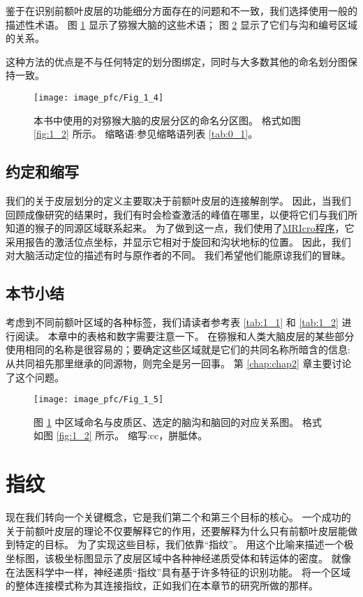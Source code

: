 \par
鉴于在识别前额叶皮层的功能细分方面存在的问题和不一致，我们选择使用一般的描述性术语。
图 \ref{fig:1_4} 显示了猕猴大脑的这些术语；
图 \ref{fig:1_5} 显示了它们与沟和编号区域的关系。

这种方法的优点是不与任何特定的划分图绑定，同时与大多数其他的命名划分图保持一致。

\begin{figure}[!htb]
	\centering
	\texttt{[image: image\_pfc/Fig\_1\_4]}
	\caption{本书中使用的对猕猴大脑的皮层分区的命名分区图。
		格式如图 \ref{fig:1_2} 所示。
		缩略语:参见缩略语列表 \ref{tab:0_1}。\label{fig:1_4}}
\end{figure}




\subsection{约定和缩写}
我们的关于皮层划分的定义主要取决于前额叶皮层的连接解剖学。
因此，当我们回顾成像研究的结果时，我们有时会检查激活的峰值在哪里，以便将它们与我们所知道的猴子的同源区域联系起来。
为了做到这一点，我们使用了\href{http://www.cabiatl.com/mricro/MRIcro/index.html}{MRIcro程序}，它采用报告的激活位点坐标，并显示它相对于旋回和沟状地标的位置。
因此，我们对大脑活动定位的描述有时与原作者的不同。
我们希望他们能原谅我们的冒昧。


\subsection{本节小结}
考虑到不同前额叶区域的各种标签，我们请读者参考表 \ref{tab:1_1} 和 \ref{tab:1_2} 进行阅读。
本章中的表格和数字需要注意一下。
在猕猴和人类大脑皮层的某些部分使用相同的名称是很容易的；要确定这些区域就是它们的共同名称所暗含的信息:从共同祖先那里继承的同源物，则完全是另一回事。
第 \ref{chap:chap2} 章主要讨论了这个问题。

\begin{figure}[!htb]
	\centering
	\texttt{[image: image\_pfc/Fig\_1\_5]}
	\caption{图 \ref{fig:1_4} 中区域命名与皮质区、选定的脑沟和脑回的对应关系图。
		格式如图 \ref{fig:1_2} 所示。
		缩写:cc，胼胝体。\label{fig:1_5}}
\end{figure}



\section{指纹}
现在我们转向一个关键概念，它是我们第二个和第三个目标的核心。
一个成功的关于前额叶皮层的理论不仅要解释它的作用，还要解释为什么只有前额叶皮层能做到特定的目标。
为了实现这些目标，我们依靠“指纹”。
用这个比喻来描述一个极坐标图\cite{zilles2001cyto}，该极坐标图显示了皮层区域中各种神经递质受体和转运体的密度。
就像在法医科学中一样，神经递质“指纹”具有基于许多特征的识别功能。
将一个区域的整体连接模式称为其连接指纹\cite{2002Dorsal}，正如我们在本章节的研究所做的那样。


